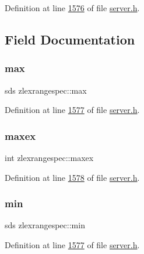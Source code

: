 Definition at line \hyperlink{server_8h_source_l01576}{1576} of file \hyperlink{server_8h_source}{server.\+h}.



\subsection{Field Documentation}
\mbox{\label{structzlexrangespec_acac503c865c2d0e90934ae264ff02672}} 
\subsubsection{\texorpdfstring{max}{max}}
{\footnotesize\ttfamily sds zlexrangespec\+::max}



Definition at line \hyperlink{server_8h_source_l01577}{1577} of file \hyperlink{server_8h_source}{server.\+h}.

\mbox{\label{structzlexrangespec_af73a17bf171634f859491e8e1573c4e6}} 
\subsubsection{\texorpdfstring{maxex}{maxex}}
{\footnotesize\ttfamily int zlexrangespec\+::maxex}



Definition at line \hyperlink{server_8h_source_l01578}{1578} of file \hyperlink{server_8h_source}{server.\+h}.

\mbox{\label{structzlexrangespec_a8ef5086f1b2ad8c416afc396272e5e2f}} 
\subsubsection{\texorpdfstring{min}{min}}
{\footnotesize\ttfamily sds zlexrangespec\+::min}



Definition at line \hyperlink{server_8h_source_l01577}{1577} of file \hyperlink{server_8h_source}{server.\+h}.

\mbox{\label{structzlexrangespec_a238a550976132316a888b6fa8c3e1cd8}} 
